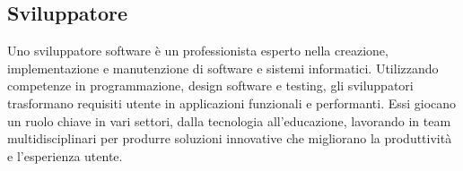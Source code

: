 \vspace{2em}
\subsection*{Sviluppatore}
\par Uno sviluppatore software è un professionista esperto nella creazione, implementazione e manutenzione di software e sistemi informatici. Utilizzando competenze in programmazione, design software e testing, gli sviluppatori trasformano requisiti utente in applicazioni funzionali e performanti. Essi giocano un ruolo chiave in vari settori, dalla tecnologia all'educazione, lavorando in team multidisciplinari per produrre soluzioni innovative che migliorano la produttività e l'esperienza utente.
